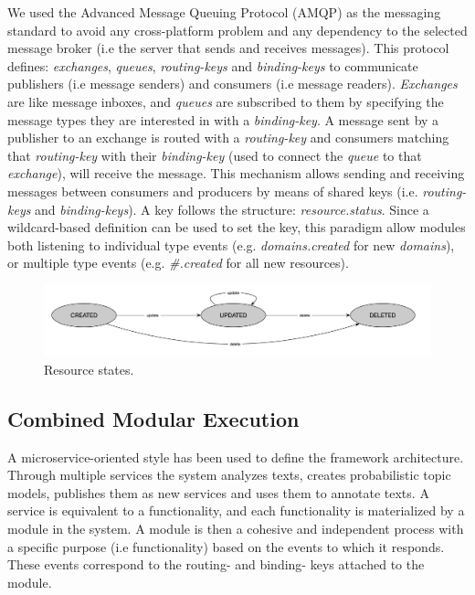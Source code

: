 We used the Advanced Message Queuing Protocol (AMQP) as the messaging standard to avoid any cross-platform problem and any dependency to the selected message broker (i.e the server that sends and receives messages). This protocol defines: \textit{exchanges}, \textit{queues}, \textit{routing-keys} and \textit{binding-keys} to communicate publishers (i.e message senders) and consumers (i.e message readers). \textit{Exchanges} are like message inboxes, and \textit{queues} are subscribed to them by specifying the message types they are interested in with a \textit{binding-key}. A message sent by a publisher to an exchange is routed with a \textit{routing-key} and consumers matching that \textit{routing-key} with their \textit{binding-key} (used to connect the \textit{queue} to that \textit{exchange}), will receive the message. This mechanism allows sending and receiving messages between consumers and producers by means of shared keys (i.e. \textit{routing-keys} and \textit{binding-keys}). A key follows the structure: \textit{resource.status}. Since a wildcard-based definition can be used to set the key, this paradigm allow modules both listening to individual type events (e.g. \textit{domains.created} for new \textit{domains}), or multiple type events (e.g. \textit{\#.created} for all new resources).


\begin{figure}
  \center
  \includegraphics[scale=0.3]{resource-states}
  \caption{Resource states.}
  \label{fig:librairy-states}
\end{figure}


\subsection{Combined Modular Execution}

A microservice-oriented style has been used to define the framework architecture. Through multiple services the system analyzes texts, creates probabilistic topic models, publishes them as new services and uses them to annotate texts. A service is equivalent to a functionality, and each functionality is materialized by a module in the system. A module is then a cohesive and independent process \cite{Dragoni2016} with a specific purpose (i.e functionality) based on the events to which it responds. These events correspond to the routing- and binding- keys attached to the module.

